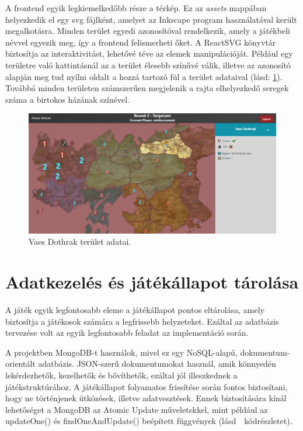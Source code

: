 \documentclass[
]{thesis-ekf}
\theoremstyle{definition}
\theoremstyle{remark}
\begin{document}
	A frontend egyik legkiemelkedőbb része a térkép. Ez az \emph{assets} mappában helyezkedik el egy svg fájlként, amelyet az Inkscape program használatával került megalkotásra. Minden terület egyedi azonosítóval rendelkezik, amely a játékbeli névvel egyezik meg, így a frontend felismerheti őket. A ReactSVG könyvtár biztosítja az interaktivitást, lehetővé téve az elemek manipulációját. Például egy területre való kattintásnál az a terület élesebb színűvé válik, illetve az azonosító alapján meg tud nyílni oldalt a hozzá tartozó fül a terület adataival (lásd: \ref{territory-selected}). Továbbá minden területen számszerűen megjelenik a rajta elhelyezkedő seregek száma a birtokos házának színével. 
	
	\begin{figure}[ht!]
		\centering
		\includegraphics[width=15cm]{TerritorySelected.png}
		\caption{Vaes Dothrak terület adatai.}
		\label{territory-selected}
	\end{figure}
	
	\section{Adatkezelés és játékállapot tárolása}
	
	A játék egyik legfontosabb eleme a játékállapot pontos eltárolása, amely biztosítja a játékosok számára a legfrissebb helyzeteket. Ezáltal az adatbázis tervezése volt az egyik legfontosabb feladat az implementáció során. 
	
	A projektben MongoDB-t használok, mivel ez egy NoSQL-alapú, dokumentum-orientált adatbázis. JSON-szerű dokumentumokat használ, amik könnyedén lekérdezhetők, kezelhetők és bővíthetők, ezáltal jól illeszkednek a játékstruktúrához. \cite{MongoDB} A játékállapot folyamatos frissítése során fontos biztosítani, hogy ne történjenek ütközések, illetve adatvesztések. Ennek biztosítására kínál lehetőséget a MongoDB az Atomic Update műveletekkel, mint például az updateOne() és findOneAndUpdate() beépített függvények (lásd~~kódrészletet).
	
\end{document}
